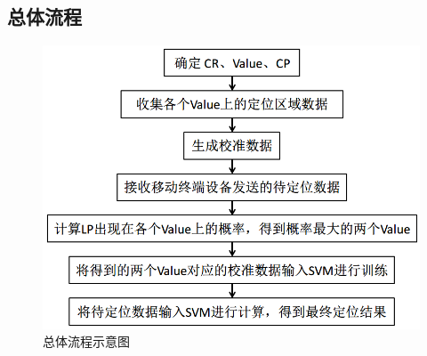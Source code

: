\documentclass[a4paper, UTF8, twocolumn ]{ctexart}
\begin{document}
\subsection{总体流程}
\begin{figure}[!ht]\centering
  \includegraphics[keepaspectratio, scale=0.3]{no11.png}
  \caption{总体流程示意图\label{fig:no11}} 
\end{figure}
\end{document}
